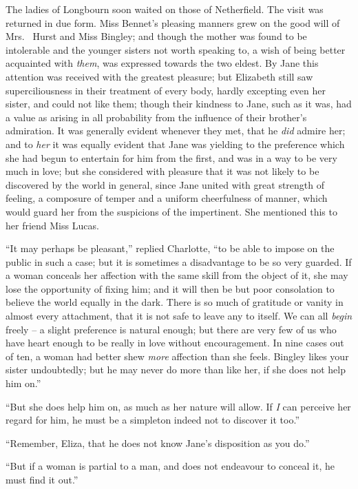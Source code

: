 
The ladies of Longbourn soon waited on those of
Netherfield. The visit was returned in due form. Miss
Bennet’s pleasing manners grew on the good will of Mrs.\ %
Hurst and Miss Bingley; and though the mother was
found to be intolerable and the younger sisters not worth
speaking to, a wish of being better acquainted with \textit{them},
was expressed towards the two eldest. By Jane this
attention was received with the greatest pleasure; but
Elizabeth still saw superciliousness in their treatment of
every body, hardly excepting even her sister, and could
not like them; though their kindness to Jane, such as it
was, had a value as arising in all probability from the
influence of their brother’s admiration. It was generally
evident whenever they met, that he \textit{did} admire her; and
to \textit{her} it was equally evident that Jane was yielding to the
preference which she had begun to entertain for him from
the first, and was in a way to be very much in love; but
she considered with pleasure that it was not likely to be
discovered by the world in general, since Jane united with
great strength of feeling, a composure of temper and a
uniform cheerfulness of manner, which would guard her
from the suspicions of the impertinent. She mentioned
this to her friend Miss Lucas.

“It may perhaps be pleasant,” replied Charlotte, “to
be able to impose on the public in such a case; but it is
sometimes a disadvantage to be so very guarded. If
a woman conceals her affection with the same skill from
the object of it, she may lose the opportunity of fixing
him; and it will then be but poor consolation to believe
the world equally in the dark. There is so much of gratitude
or vanity in almost every attachment, that it is not
safe to leave any to itself. We can all \textit{begin} freely -- a slight
preference is natural enough; but there are very few of
us who have heart enough to be really in love without
encouragement. In nine cases out of ten, a woman had
better shew \textit{more} affection than she feels. Bingley likes
your sister undoubtedly; but he may never do more than
like her, if she does not help him on.”

“But she does help him on, as much as her nature will
allow. If \textit{I} can perceive her regard for him, he must be
a simpleton indeed not to discover it too.”

“Remember, Eliza, that he does not know Jane’s
disposition as you do.”

“But if a woman is partial to a man, and does not
endeavour to conceal it, he must find it out.”

